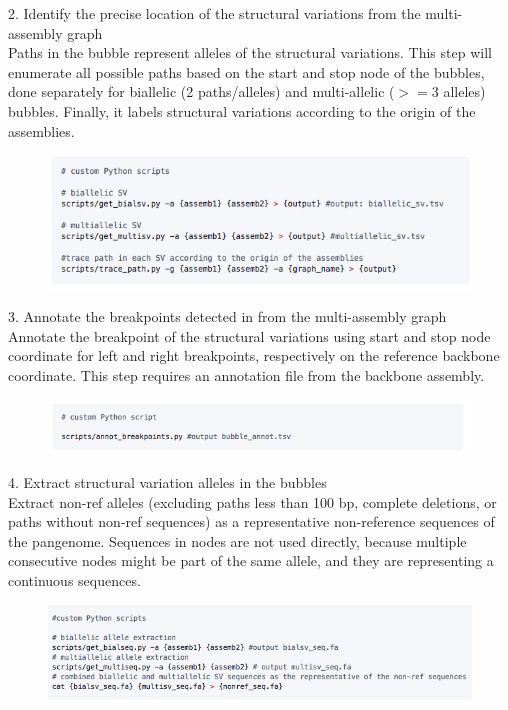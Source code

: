 \documentclass[../main.tex]{subfiles}
\begin{document}
\begin{flushleft}
2. Identify the precise location of the structural variations from the multi-assembly graph \\ Paths in the bubble represent alleles of the structural variations. This step will enumerate all possible paths based on the start and stop node of the bubbles, done separately for biallelic (2 paths/alleles) and multi-allelic ($>=$3 alleles) bubbles. Finally, it labels structural variations according to the origin of the assemblies. \\ 
\vspace{3mm}
\begin{figure}[!htb]
    \centering
    \includegraphics[width=\textwidth]{paper3/supplement/sp430.png}
\end{figure}

\newpage

3. Annotate the breakpoints detected in from the multi-assembly graph \\ Annotate the breakpoint of the structural variations using start and stop node coordinate for left and right breakpoints, respectively on the reference backbone coordinate. This step requires an annotation file from the backbone assembly. \\ 
\vspace{3mm}
\begin{figure}[!htb]
    \centering
    \includegraphics[width=\textwidth]{paper3/supplement/sp431.png}
\end{figure}

4. Extract structural variation alleles in the bubbles \\ Extract non-ref alleles (excluding paths less than 100 bp, complete deletions, or paths without non-ref sequences) as a representative non-reference sequences of the pangenome. Sequences in nodes are not used directly, because multiple consecutive nodes might be part of the same allele, and they are representing a continuous sequences. \\ 
\vspace{3mm}
\begin{figure}[!htb]
    \centering
    \includegraphics[width=\textwidth]{paper3/supplement/sp432.png}
\end{figure}



\end{flushleft}
\end{document}
